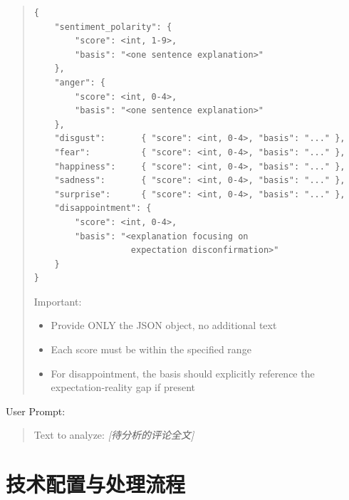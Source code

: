 \begin{quote}
\begin{verbatim}
{
    "sentiment_polarity": {
        "score": <int, 1-9>,
        "basis": "<one sentence explanation>"
    },
    "anger": {
        "score": <int, 0-4>,
        "basis": "<one sentence explanation>"
    },
    "disgust":       { "score": <int, 0-4>, "basis": "..." },
    "fear":          { "score": <int, 0-4>, "basis": "..." },
    "happiness":     { "score": <int, 0-4>, "basis": "..." },
    "sadness":       { "score": <int, 0-4>, "basis": "..." },
    "surprise":      { "score": <int, 0-4>, "basis": "..." },
    "disappointment": {
        "score": <int, 0-4>,
        "basis": "<explanation focusing on
                   expectation disconfirmation>"
    }
}
\end{verbatim}

Important:
\begin{itemize}
  \item Provide ONLY the JSON object, no additional text
  \item Each score must be within the specified range
  \item For disappointment, the basis should explicitly reference the expectation-reality gap if present
\end{itemize}
\end{quote}

\vspace{0.5em}
\noindent User Prompt:
\begin{quote}\small
Text to analyze: \textit{[待分析的评论全文]}
\end{quote}

\section{技术配置与处理流程}

